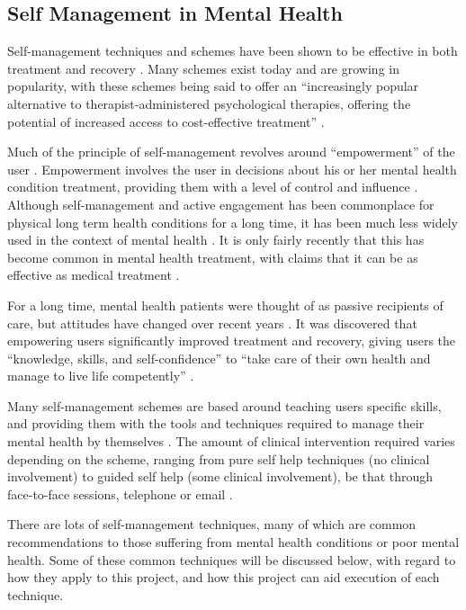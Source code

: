 \documentclass[11pt,openright,a4paper]{report}
\begin{document}
\subsection{Self Management in Mental Health}
Self-management techniques and schemes have been shown to be effective in both treatment \parencite{wrapstudy} and recovery \parencite{selfmanagementrelapse}. Many schemes exist today and are growing in popularity, with these schemes being said to offer an \enquote{increasingly popular alternative to therapist-administered psychological therapies, offering the potential of increased access to cost-effective treatment} \parencite{selfhelpanxiety}.

Much of the principle of self-management revolves around \enquote{empowerment} of the user \parencite{whoselfmanagement}. Empowerment involves the user in decisions about his or her mental health condition treatment, providing them with a level of control and influence \parencite{whoempowerment}. Although self-management and active engagement has been commonplace for physical long term health conditions for a long time, it has been much less widely used in the context of mental health \parencite{whoselfmanagement}. It is only fairly recently that this has become common in mental health treatment, with claims that it can be as effective as medical treatment \parencite{mhfselfmanagement}.

For a long time, mental health patients were thought of as passive recipients of care, but attitudes have changed over recent years \parencite{cpselfmanagement}. It was discovered that empowering users significantly improved treatment and recovery, giving users the \enquote{knowledge, skills, and self-confidence} to \enquote{take care of their own health and manage to live life competently} \parencite{vahdatpatientinvolvement}.

Many self-management schemes are based around teaching users specific skills, and providing them with the tools and techniques required to manage their mental health by themselves \parencite{selfmanagementuk}. The amount of clinical intervention required varies depending on the scheme, ranging from pure self help techniques (no clinical involvement) to guided self help (some clinical involvement), be that through face-to-face sessions, telephone or email \parencite{selfhelpanxiety}.

There are lots of self-management techniques, many of which are common recommendations to those suffering from mental health conditions or poor mental health. Some of these common techniques will be discussed below, with regard to how they apply to this project, and how this project can aid execution of each technique.
\end{document}

